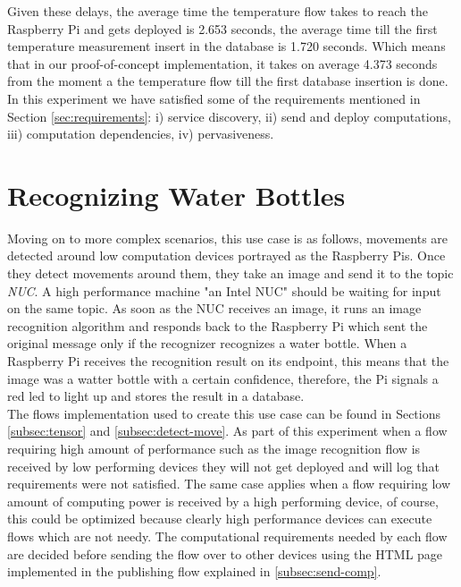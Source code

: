 \noindent Given these delays, the average time the temperature flow takes to reach the Raspberry Pi and gets deployed is 2.653 seconds, the average time till the first temperature measurement insert in the database    is 1.720 seconds. Which means that in our proof-of-concept implementation, it takes on average 4.373 seconds from the moment a
the temperature flow till the first database  insertion is done. In this experiment we have satisfied some of the requirements mentioned in  Section \ref{sec:requirements}: i) service discovery, ii) send and deploy computations, iii) computation dependencies, iv) pervasiveness.

\section{Recognizing Water Bottles } \label{sec:rwb}


Moving on to more complex scenarios, this use case  is as follows, movements are detected around low computation devices portrayed as the Raspberry Pis. Once they detect movements around them, they take an image and send it to the topic \textit{NUC}. A high performance machine "an Intel NUC" should be waiting for input on the same topic. As soon as the NUC  receives an image, it runs an image recognition algorithm and responds back to the Raspberry Pi which sent the original message  only if the recognizer recognizes a water bottle. When a Raspberry Pi receives the recognition result on its endpoint, this means that the image was a watter bottle with a certain confidence, therefore, the Pi signals a red led to light up and stores the result in a database. \\ 

\noindent The flows implementation used to create this use case can be found in Sections \ref{subsec:tensor} and \ref{subsec:detect-move}.  As part of this experiment when a flow requiring high amount of performance such as the image recognition flow is received by low performing devices they will not get deployed and  will log that requirements were not satisfied. The same case applies when a flow requiring low amount of computing power is received by a high performing device, of course, this could be optimized because clearly high performance devices can execute flows which are not needy. The computational requirements needed by each flow are decided before sending the flow over to other devices using the HTML page implemented in the publishing flow explained in \ref{subsec:send-comp}.\\ 

